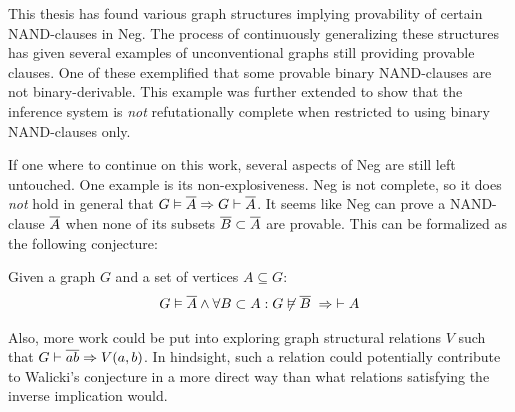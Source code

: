 This thesis has found various graph structures implying provability of certain NAND-clauses in Neg.
The process of continuously generalizing these structures has given several examples of unconventional graphs still providing provable clauses.
One of these exemplified that some provable binary NAND-clauses are not binary-derivable.
This example was further extended to show that the inference system is \textit{not} refutationally complete when restricted to using binary NAND-clauses only.

If one where to continue on this work, several aspects of Neg are still left untouched.
One example is its non-explosiveness.
Neg is not complete, so it does \textit{not} hold in general that $G \vDash \ol{A} \Rightarrow G \vdash \ol{A}$.
It seems like Neg can prove a NAND-clause $\ol{A}$ when none of its subsets $\ol{B} \subset \ol{A}$ are provable.
This can be formalized as the following conjecture:
\begin{conjecture}
  Given a graph $G$ and a set of vertices $A \subseteq G$:
  \begin{align}
    G \vDash \ol{A} \wedge \forall B \subset A: G \not\vDash \ol{ B } \;\Rightarrow \; \vdash A
  \end{align}
\end{conjecture}

Also, more work could be put into exploring graph structural relations $V$ such that $G \vdash \ol{ab} \Rightarrow V(a,b)$.
In hindsight, such a relation could potentially contribute to Walicki's conjecture in a more direct way than what relations satisfying the inverse implication would.

